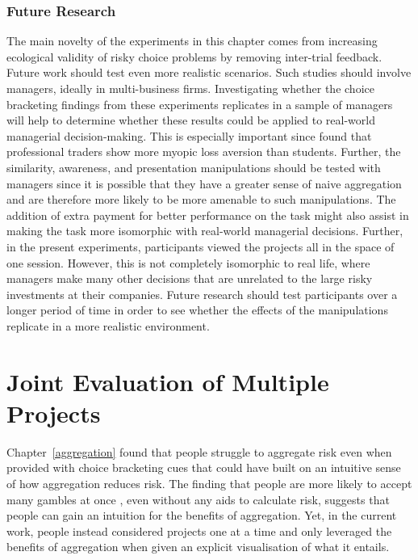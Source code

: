 \documentclass[a4paper, nobind]{templates/ociamthesis}
\theoremstyle{definition}
\theoremstyle{definition}
\theoremstyle{definition}
\theoremstyle{definition}
\theoremstyle{remark}
\begin{document}
\subsection{Future Research}

The main novelty of the experiments in this chapter comes from increasing
ecological validity of risky choice problems by removing inter-trial feedback.
Future work should test even more realistic scenarios. Such studies should
involve managers, ideally in multi-business firms. Investigating whether the
choice bracketing findings from these experiments replicates in a sample of
managers will help to determine whether these results could be applied to
real-world managerial decision-making. This is especially important since
\textcite{haigh2005} found that professional traders show more myopic loss aversion than
students. Further, the similarity, awareness, and presentation manipulations
should be tested with managers since it is possible that they have a greater
sense of naive aggregation and are therefore more likely to be more amenable to
such manipulations. The addition of extra payment for better performance on the
task might also assist in making the task more isomorphic with real-world
managerial decisions. Further, in the present experiments, participants viewed
the projects all in the space of one session. However, this is not completely
isomorphic to real life, where managers make many other decisions that are
unrelated to the large risky investments at their companies. Future research
should test participants over a longer period of time \autocite[as in][]{beshears2016} in
order to see whether the effects of the manipulations replicate in a more
realistic environment.

\newpage

\printbibliography[segment=\therefsegment,heading=subbibintoc]

\hypertarget{interstitial-1}{%
\chapter{Joint Evaluation of Multiple Projects}\label{interstitial-1}}

Chapter~\ref{aggregation} found that people struggle to aggregate risk even
when provided with choice bracketing cues that could have built on an intuitive
sense of how aggregation reduces risk. The finding that people are more likely
to accept many gambles at once \autocites[e.g.,][]{samuelson1963,wedell1994}, even without
any aids to calculate risk, suggests that people can gain an intuition for the
benefits of aggregation. Yet, in the current work, people instead considered
projects one at a time and only leveraged the benefits of aggregation when given
an explicit visualisation of what it entails.
\end{document}

